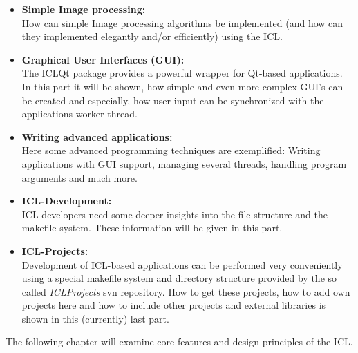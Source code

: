 \begin{itemize}
\item \textbf{Simple Image processing:}\\ How can simple Image processing algorithms be implemented (and how can they implemented elegantly and/or efficiently) using the ICL.
\item \textbf{Graphical User Interfaces (GUI):}\\ The ICLQt package provides a powerful wrapper for Qt-based applications. In this part it will be shown, how simple and even more complex GUI's can be created and especially, how user input can be synchronized with the applications worker thread.
\item \textbf{Writing advanced applications:}\\ Here some advanced programming techniques are exemplified: Writing applications with GUI support, managing several threads, handling program arguments and much more.
\item \textbf{ICL-Development:}\\ICL developers need some deeper insights into the file structure and the makefile system. These information will be given in this part.
\item \textbf{ICL-Projects:}\\Development of ICL-based applications can be performed very conveniently using a special makefile system and directory structure provided by the so called \emph{ICLProjects} svn repository. How to get these projects, how to add own projects here and how to include other projects and external libraries is shown in this (currently) last part. 
\end{itemize} 


The following chapter will examine core features and design principles of the ICL.



